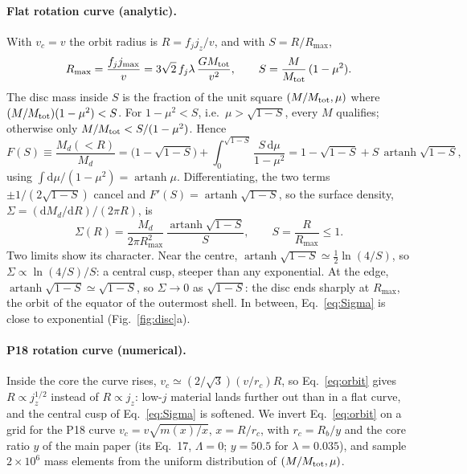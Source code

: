 \documentclass[11pt,a4paper]{article}
\newcommand{\dd}{\mathrm{d}}
\newcommand{\rc}{r_c}
\newcommand{\Rb}{R_b}
\newcommand{\Rmax}{R_{\max}}
\begin{document}
\paragraph{Flat rotation curve (analytic).} With $v_c=v$ the orbit
radius is $R=f_jj_z/v$, and with $S=R/\Rmax$,
\begin{equation}
  \Rmax=\frac{f_jj_{\max}}{v}=3\sqrt2\,f_j\lambda\,\frac{GM_{\rm tot}}{v^2},
  \qquad S=\frac{M}{M_{\rm tot}}\,(1-\mu^2).
\end{equation}
The disc mass inside $S$ is the fraction of the unit square
$(M/M_{\rm tot},\mu)$ where $(M/M_{\rm tot})(1-\mu^2)<S$. For
$1-\mu^2<S$, i.e.\ $\mu>\sqrt{1-S}$, every $M$ qualifies; otherwise only
$M/M_{\rm tot}<S/(1-\mu^2)$. Hence
\begin{equation}
  F(S)\equiv\frac{M_d(<R)}{M_d}
  =\bigl(1-\sqrt{1-S}\bigr)+\int_0^{\sqrt{1-S}}\frac{S\,\dd\mu}{1-\mu^2}
  =1-\sqrt{1-S}+S\,\operatorname{artanh}\sqrt{1-S},
  \label{eq:F}
\end{equation}
using $\int\dd\mu/(1-\mu^2)=\operatorname{artanh}\mu$. Differentiating,
the two terms $\pm1/(2\sqrt{1-S})$ cancel and
$F'(S)=\operatorname{artanh}\sqrt{1-S}$, so the surface density,
$\Sigma=(\dd M_d/\dd R)/(2\pi R)$, is
\begin{equation}
  \Sigma(R)=\frac{M_d}{2\pi\Rmax^2}\,
  \frac{\operatorname{artanh}\sqrt{1-S}}{S},\qquad S=\frac{R}{\Rmax}\le1 .
  \label{eq:Sigma}
\end{equation}
Two limits show its character. Near the centre,
$\operatorname{artanh}\sqrt{1-S}\simeq\tfrac12\ln(4/S)$, so
$\Sigma\propto\ln(4/S)/S$: a central cusp, steeper than any exponential.
At the edge, $\operatorname{artanh}\sqrt{1-S}\simeq\sqrt{1-S}$, so
$\Sigma\to0$ as $\sqrt{1-S}$: the disc ends sharply at $\Rmax$, the
orbit of the equator of the outermost shell. In between,
Eq.~\eqref{eq:Sigma} is close to exponential (Fig.~\ref{fig:disc}a).

\paragraph{P18 rotation curve (numerical).} Inside the core the curve
rises, $v_c\simeq(2/\sqrt3)(v/\rc)R$, so Eq.~\eqref{eq:orbit} gives
$R\propto j_z^{1/2}$ instead of $R\propto j_z$: low-$j$ material lands
further out than in a flat curve, and the central cusp of
Eq.~\eqref{eq:Sigma} is softened. We invert Eq.~\eqref{eq:orbit} on a
grid for the P18 curve $v_c=v\sqrt{m(x)/x}$, $x=R/\rc$, with
$\rc=\Rb/y$ and the core ratio $y$ of the main paper (its Eq.~17,
$\Lambda=0$; $y=50.5$ for $\lambda=0.035$), and sample $2\times10^6$ mass
elements from the uniform distribution of $(M/M_{\rm tot},\mu)$.
\end{document}
